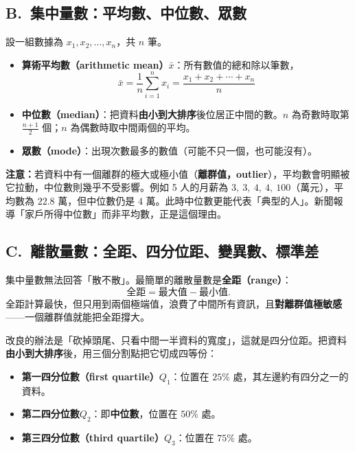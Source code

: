\documentclass[11pt]{article}
\begin{document}
\subsection*{\sffamily B.\ 集中量數：平均數、中位數、眾數}

設一組數據為 $x_1, x_2, \dots, x_n$，共 $n$ 筆。

\begin{itemize}\setlength{\itemsep}{3pt}
\item \textbf{算術平均數（arithmetic mean）}$\bar{x}$：所有數值的總和除以筆數，
$$\boxed{\;\bar{x} = \frac{1}{n}\sum_{i=1}^{n} x_i = \frac{x_1 + x_2 + \cdots + x_n}{n}\;}$$
\item \textbf{中位數（median）}：把資料\textbf{由小到大排序}後位居正中間的數。$n$ 為奇數時取第 $\frac{n+1}{2}$ 個；$n$ 為偶數時取中間兩個的平均。
\item \textbf{眾數（mode）}：出現次數最多的數值（可能不只一個，也可能沒有）。
\end{itemize}

\textbf{注意：}若資料中有一個離群的極大或極小值（\textbf{離群值，outlier}），平均數會明顯被它拉動，中位數則幾乎不受影響。例如 5 人的月薪為 $3,\ 3,\ 4,\ 4,\ 100$（萬元），平均數為 $22.8$ 萬，但中位數仍是 $4$ 萬。此時中位數更能代表「典型的人」。新聞報導「家戶所得中位數」而非平均數，正是這個理由。

\subsection*{\sffamily C.\ 離散量數：全距、四分位距、變異數、標準差}

集中量數無法回答「散不散」。最簡單的離散量數是\textbf{全距（range）}：
$$\text{全距} = \text{最大值} - \text{最小值}.$$
全距計算最快，但只用到兩個極端值，浪費了中間所有資訊，且\textbf{對離群值極敏感}——一個離群值就能把全距撐大。

改良的辦法是「砍掉頭尾、只看中間一半資料的寬度」，這就是四分位距。把資料\textbf{由小到大排序}後，用三個分割點把它切成四等份：

\begin{itemize}\setlength{\itemsep}{2pt}
\item \textbf{第一四分位數（first quartile）}$Q_1$：位置在 $25\%$ 處，其左邊約有四分之一的資料。
\item \textbf{第二四分位數}$Q_2$：即\textbf{中位數}，位置在 $50\%$ 處。
\item \textbf{第三四分位數（third quartile）}$Q_3$：位置在 $75\%$ 處。
\end{itemize}
\end{document}
